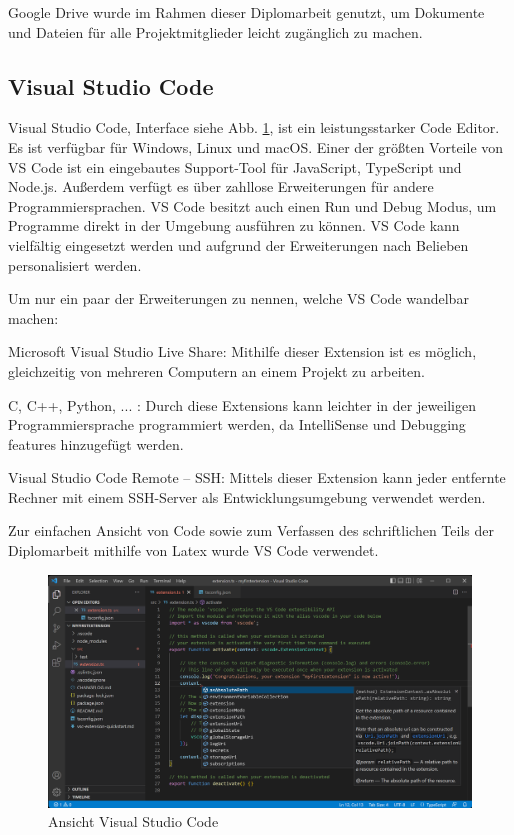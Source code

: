 Google Drive wurde im Rahmen dieser Diplomarbeit genutzt, um Dokumente und Dateien für alle Projektmitglieder leicht zugänglich zu machen.


\subsection{Visual Studio Code} 
Visual Studio Code, Interface siehe Abb. \ref{fig:impl:vsCode}, ist ein leistungsstarker Code Editor. Es ist verfügbar für Windows, Linux und macOS.
Einer der größten Vorteile von VS Code ist ein eingebautes Support-Tool für JavaScript, TypeScript und Node.js. Außerdem verfügt es über zahllose Erweiterungen für andere Programmiersprachen. VS Code besitzt auch einen Run und Debug Modus, um Programme direkt in der Umgebung ausführen zu können.
VS Code kann vielfältig eingesetzt werden und aufgrund der Erweiterungen nach Belieben personalisiert werden. \cite{VSCodeOfficialSite}


Um nur ein paar der Erweiterungen zu nennen, welche VS Code wandelbar machen:


\begin{compactitem}
\item Microsoft Visual Studio Live Share: Mithilfe dieser Extension ist es möglich, gleichzeitig von mehreren Computern an einem Projekt zu arbeiten.
\item C, C++, Python, ... : Durch diese Extensions kann leichter in der jeweiligen Programmiersprache programmiert werden, da IntelliSense und Debugging features hinzugefügt werden.
\item Visual Studio Code Remote – SSH: Mittels dieser Extension kann jeder entfernte Rechner mit einem SSH-Server als Entwicklungsumgebung verwendet werden.
\end{compactitem}
\cite{VSCodeOfficialSite}


Zur einfachen Ansicht von Code sowie zum Verfassen des schriftlichen Teils der Diplomarbeit mithilfe von Latex wurde VS Code verwendet.


\begin{figure}[h t]
\centering
\includegraphics[scale=0.48]{pics/visualStudioCode.png}
\caption{Ansicht Visual Studio Code}
\label{fig:impl:vsCode}
\end{figure}


